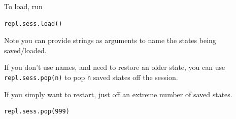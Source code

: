\documentclass[11pt]{article}
\begin{document}
To load, run
\begin{verbatim}
repl.sess.load()
\end{verbatim}

Note you can provide strings as arguments to name the states
being saved/loaded.

If you don't use names, and need to restore an older state,
you can use \texttt{repl.sess.pop(n)} to pop \texttt{n} saved states off the session.

If you simply want to restart, just off an extreme number
of saved states.
\begin{verbatim}
repl.sess.pop(999)
\end{verbatim}
\end{document}
